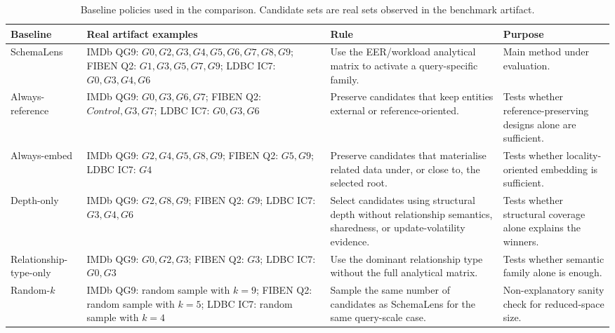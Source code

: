 \begin{table}[t]
\centering
\caption{Baseline policies used in the comparison. Candidate sets are real sets observed in the benchmark artifact.}
\label{tab:baseline-policies}
\small
\setlength{\tabcolsep}{3pt}
\begin{tabular}{p{}p{}p{}p{}}
\toprule
Baseline & Real artifact examples & Rule & Purpose \\
\midrule
SchemaLens & IMDb QG9: $G0,G2,G3,G4,G5,G6,G7,G8,G9$; FIBEN Q2: $G1,G3,G5,G7,G9$; LDBC IC7: $G0,G3,G4,G6$ & Use the EER/workload analytical matrix to activate a query-specific family. & Main method under evaluation. \\
\midrule
Always-reference & IMDb QG9: $G0,G3,G6,G7$; FIBEN Q2: $Control,G3,G7$; LDBC IC7: $G0,G3,G6$ & Preserve candidates that keep entities external or reference-oriented. & Tests whether reference-preserving designs alone are sufficient. \\
\midrule
Always-embed & IMDb QG9: $G2,G4,G5,G8,G9$; FIBEN Q2: $G5,G9$; LDBC IC7: $G4$ & Preserve candidates that materialise related data under, or close to, the selected root. & Tests whether locality-oriented embedding is sufficient. \\
\midrule
Depth-only & IMDb QG9: $G2,G8,G9$; FIBEN Q2: $G9$; LDBC IC7: $G3,G4,G6$ & Select candidates using structural depth without relationship semantics, sharedness, or update-volatility evidence. & Tests whether structural coverage alone explains the winners. \\
\midrule
Relationship-type-only & IMDb QG9: $G0,G2,G3$; FIBEN Q2: $G3$; LDBC IC7: $G0,G3$ & Use the dominant relationship type without the full analytical matrix. & Tests whether semantic family alone is enough. \\
\midrule
Random-$k$ & IMDb QG9: random sample with $k=9$; FIBEN Q2: random sample with $k=5$; LDBC IC7: random sample with $k=4$ & Sample the same number of candidates as SchemaLens for the same query-scale case. & Non-explanatory sanity check for reduced-space size. \\
\bottomrule
\end{tabular}
\end{table}
